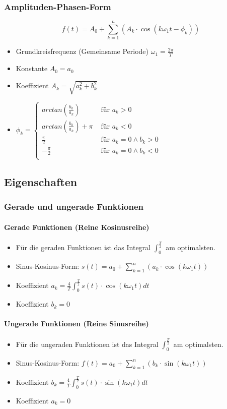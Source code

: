 \subsubsection{Amplituden-Phasen-Form}
\[
  f(t) = A_0 + \sum_{k=1}^{n}
  (A_k \cdot \cos(k \omega_1 t  - \phi_k))
\]
\begin{itemize}
  \item Grundkreisfrequenz (Gemeinsame Periode) $\omega_1 = \frac{2\pi}{T}$
  \item Konstante $A_0 = a_0$
  \item Koeffizient $A_k = \sqrt{a_k^2 + b_k^2}$
  \item $\phi_k =  \begin{cases}
      arctan\left(\frac{b_k}{a_k}\right) & \text{ für } a_k > 0 \\
      arctan\left(\frac{b_k}{a_k}\right) + \pi & \text{ für } a_k < 0 \\
      \frac{\pi}{2} & \text{ für } a_k = 0 \wedge b_k > 0\\
      -\frac{\pi}{2} & \text{ für } a_k = 0 \wedge b_k < 0\\
    \end{cases}$
\end{itemize}

\subsection{Eigenschaften}
\subsubsection{Gerade und ungerade Funktionen}
\paragraph{Gerade Funktionen (Reine Kosinusreihe)}
\begin{itemize}
  \item Für die geraden Funktionen ist das Integral
    $\int_0^{\frac{T}{2}}$ am optimalsten.
  \item Sinus-Kosinus-Form: $s(t) = a_0 + \sum_{k=1}^{n}
    (a_k \cdot \cos(k \omega_1 t))$
  \item Koeffizient $a_k = \frac{4}{T} \int_0^{\frac{T}{2}} s(t) \cdot \cos(k \omega_1 t) dt$
  \item Koeffizient $b_k = 0$
\end{itemize}
\paragraph{Ungerade Funktionen (Reine Sinusreihe)}
\begin{itemize}
  \item Für die ungeraden Funktionen ist das Integral
    $\int_0^{\frac{T}{2}}$ am optimalsten.
  \item Sinus-Kosinus-Form: $f(t) = a_0 + \sum_{k=1}^{n}
    (b_k \cdot \sin(k \omega_1 t))$
  \item Koeffizient $b_k = \frac{4}{T} \int_0^{\frac{T}{2}} s(t) \cdot \sin(k \omega_1 t) dt$
  \item Koeffizient $a_k = 0$
\end{itemize}

